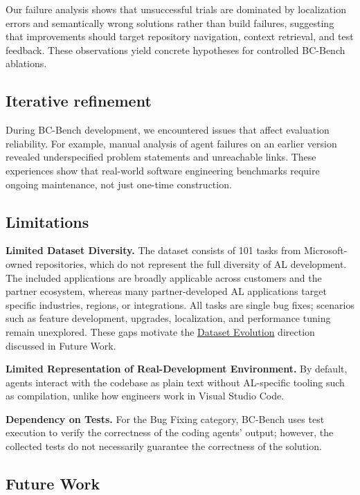 \documentclass{article}
\begin{document}
Our failure analysis shows that unsuccessful trials are dominated by localization errors and semantically wrong solutions rather than build failures, suggesting that improvements should target repository navigation, context retrieval, and test feedback. These observations yield concrete hypotheses for controlled BC-Bench ablations.

\subsection{Iterative refinement}

During BC-Bench development, we encountered issues that affect  evaluation reliability. For example, manual analysis of agent failures on an earlier version revealed underspecified problem statements and unreachable links. These experiences show that real-world software engineering benchmarks require ongoing maintenance, not just one-time construction.

\subsection{Limitations}

\textbf{Limited Dataset Diversity.} The dataset consists of 101 tasks from Microsoft-owned repositories, which do not represent the full diversity of AL development. The included applications are broadly applicable across customers and the partner ecosystem, whereas many partner-developed AL applications target specific industries, regions, or integrations. All tasks are single bug fixes; scenarios such as feature development, upgrades, localization, and performance tuning remain unexplored. These gaps motivate the \hyperref[sec:dataset-evolution]{Dataset Evolution} direction discussed in Future Work.

\textbf{Limited Representation of Real-Development Environment.} By default, agents interact with the codebase as plain text without AL-specific tooling such as compilation, unlike how engineers work in  Visual Studio Code.

\textbf{Dependency on Tests.} For the Bug Fixing category, BC-Bench uses test execution to verify the correctness of the coding agents' output; however, the collected tests do not necessarily guarantee the correctness of the solution.

\subsection{Future Work}
\end{document}
